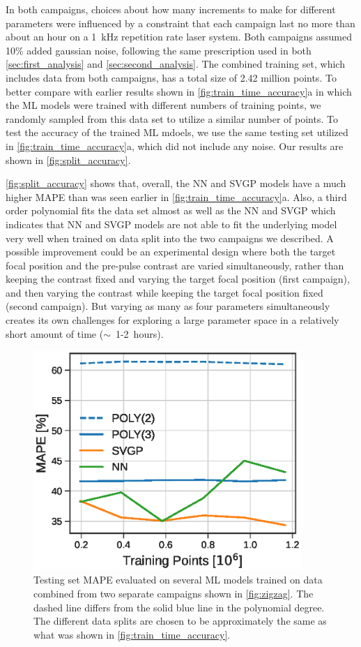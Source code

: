 In both campaigns, choices about how many increments to make for different parameters were influenced by a constraint that each campaign last no more than about an hour on a 1~kHz repetition rate laser system. Both campaigns assumed 10\% added gaussian noise, following the same prescription used in both \autoref{sec:first_analysis} and \autoref{sec:second_analysis}. The combined training set, which includes data from both campaigns, has a total size of 2.42 million points. To better compare with earlier results shown in \autoref{fig:train_time_accuracy}a in which the ML models were trained with different numbers of training points, we randomly sampled from this data set to utilize a similar number of points. To test the accuracy of the trained \gls{ML} mdoels, we use the same testing set utilized in \autoref{fig:train_time_accuracy}a, which did not include any noise. Our results are shown in \autoref{fig:split_accuracy}. 

\autoref{fig:split_accuracy} shows that, overall, the \gls{NN} and \gls{SVGP} models have a much higher \gls{MAPE} than was seen earlier in \autoref{fig:train_time_accuracy}a. Also, a third order polynomial fits the data set almost as well as the NN and SVGP which indicates that NN and SVGP models are not able to fit the underlying model very well when trained on data split into the two campaigns we described. A possible improvement could be an experimental design where both the target focal position and the pre-pulse contrast are varied simultaneously, rather than keeping the contrast fixed and varying the target focal position (first campaign), and then varying the contrast while keeping the target focal position fixed (second campaign). But varying as many as four parameters simultaneously creates its own challenges for exploring a large parameter space in a relatively short amount of time ($\sim$~1-2~hours).

\begin{figure}
	\centering
	\includegraphics[width=4in]{planning/images/paper2/fig11.eps}
	\caption{Testing set MAPE evaluated on several ML models trained on data combined from two separate campaigns shown in \autoref{fig:zigzag}. The dashed line differs from the solid blue line in the polynomial degree. The different data splits are chosen to be approximately the same as what was shown in \autoref{fig:train_time_accuracy}.} 
	\label{fig:split_accuracy}
\end{figure}

